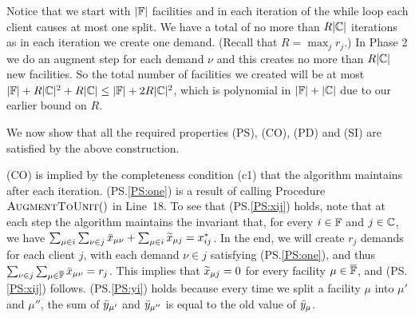 \documentclass{llncs}
\begin{document}


Notice that we start with $|\mathbb{F}|$ facilities and in each
iteration of the while loop each client causes at most one split.  We
have a total of no more than $R|\mathbb{C}|$ iterations as in each
iteration we create one demand. (Recall that $R = \max_jr_j$.) In
Phase 2 we do an augment step for each demand $\nu$ and this creates
no more than $R|\mathbb{C}|$ new facilities.  So the total number of
facilities we created will be at most $|\mathbb{F}|+ R|\mathbb{C}|^2 +
R|\mathbb{C}| \leq |\mathbb{F}| + 2R|\mathbb{C}|^2$, which is
polynomial in $|\mathbb{F}|+|\mathbb{C}|$ due to our earlier bound on
$R$.


\medskip

  We now show that all the required
properties (PS), (CO), (PD) and (SI) are satisfied by the above
construction. 

(CO) is implied by the completeness condition (c1) that the algorithm
maintains after each iteration. (PS.\ref{PS:one}) is a result of
calling Procedure~${\textsc{AugmentToUnit}}()$ in Line~18. To see that
(PS.\ref{PS:xij}) holds, note that at each step the algorithm
maintains the invariant that, for every $i\in\mathbb{F}$ and
$j\in\mathbb{C}$, we have $\sum_{\mu\in i}\sum_{\nu \in j} {\bar x}_{\mu
  \nu} + \sum_{\mu\in i} {\widetilde x}_{\mu j} = x_{ij}^\ast$. In the end,
we will create $r_j$ demands for each client $j$, with each demand
$\nu\in j$ satisfying (PS.\ref{PS:one}), and thus $\sum_{\nu\in
  j}\sum_{\mu\in\overline{\mathbb{F}}}{\bar x}_{\mu\nu}=r_j$.  This implies that
${\widetilde x}_{\mu j}=0$ for every facility $\mu\in\overline{\mathbb{F}}$, and
(PS.\ref{PS:xij}) follows.  (PS.\ref{PS:yi}) holds because every time
we split a facility $\mu$ into $\mu'$ and $\mu''$, the sum of
${\bar y}_{\mu'}$ and ${\bar y}_{\mu''}$ is equal to the old value of
${\bar y}_{\mu}$.
\end{document}
